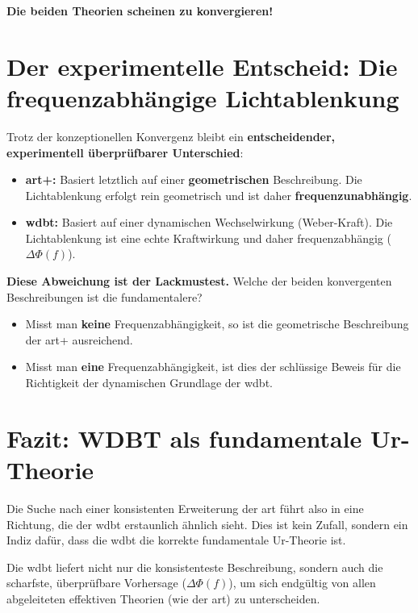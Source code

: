 \textbf{Die beiden Theorien scheinen zu konvergieren!}

\section{Der experimentelle Entscheid: Die frequenzabhängige Lichtablenkung}
Trotz der konzeptionellen Konvergenz bleibt ein \textbf{entscheidender, experimentell überprüfbarer Unterschied}:

\begin{itemize}
    \item \textbf{\gls{art}+:} Basiert letztlich auf einer \textbf{geometrischen} Beschreibung. Die Lichtablenkung erfolgt rein geometrisch und ist daher \textbf{frequenzunabhängig}.
    \item \textbf{\gls{wdbt}:} Basiert auf einer dynamischen Wechselwirkung (Weber-Kraft). Die Lichtablenkung ist eine echte Kraftwirkung und daher frequenzabhängig ($\Delta \Phi(f)$).
\end{itemize}

\textbf{Diese Abweichung ist der Lackmustest.} Welche der beiden konvergenten Beschreibungen ist die fundamentalere?

\begin{itemize}
    \item Misst man \textbf{keine} Frequenzabhängigkeit, so ist die geometrische Beschreibung der \gls{art}+ ausreichend.
    \item Misst man \textbf{eine} Frequenzabhängigkeit, ist dies der schlüssige Beweis für die Richtigkeit der dynamischen Grundlage der \gls{wdbt}.
\end{itemize}

\section{Fazit: WDBT als fundamentale Ur-Theorie}
Die Suche nach einer konsistenten Erweiterung der \gls{art} führt also in eine Richtung, die der \gls{wdbt} erstaunlich ähnlich sieht. Dies ist kein Zufall, sondern ein Indiz dafür, dass die \gls{wdbt}
die korrekte fundamentale Ur-Theorie ist.

Die \gls{wdbt} liefert nicht nur die konsistenteste Beschreibung, sondern auch die scharfste, überprüfbare Vorhersage ($\Delta \Phi(f)$), um sich endgültig von allen abgeleiteten effektiven
Theorien (wie der \gls{art}) zu unterscheiden.
